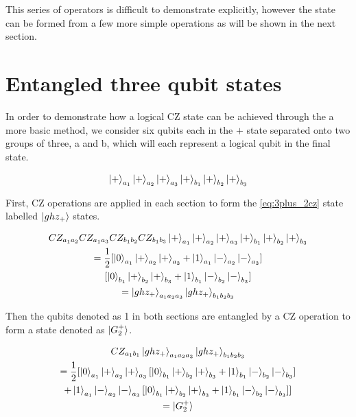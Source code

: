 This series of operators is difficult to demonstrate explicitly, however the state can be formed from a few more simple operations as will be shown in the next section.


\section{Entangled three qubit states}
\label{sec:entag_3_qb}

In order to demonstrate how a logical CZ state can be achieved through the a more basic method, we consider six qubits each in the $+$ state separated onto two groups of three, a and b, which will each represent a logical qubit in the final state.

\begin{equation*}
\ket{+}_{a_{1}} \ket{+}_{a_{2}} \ket{+}_{a_{3}} \ket{+}_{b_{1}} \ket{+}_{b_{2}} \ket{+}_{b_{3}}
\end{equation*}

First, CZ operations are applied in each section to form the \eqref{eq:3plus_2cz} state labelled $\ket{ghz_{+}}$ states.

\begin{multline}
CZ_{a_{1}a_{2}} CZ_{a_{1}a_{3}} CZ_{b_{1}b_{2}} CZ_{b_{1}b_{3}} \ket{+}_{a_{1}} \ket{+}_{a_{2}} \ket{+}_{a_{3}} \ket{+}_{b_{1}} \ket{+}_{b_{2}} \ket{+}_{b_{3}} \\
= \frac{1}{2} [\ket{0}_{a_{1}} \ket{+}_{a_{2}} \ket{+}_{a_{3}} + \ket{1}_{a_{1}} \ket{-}_{a_{2}} \ket{-}_{a_{3}}] \\
[\ket{0}_{b_{1}} \ket{+}_{b_{2}} \ket{+}_{b_{3}} + \ket{1}_{b_{1}} \ket{-}_{b_{2}} \ket{-}_{b_{3}}] \\
= \ket{ghz_{+}}_{a_{1}a_{2}a_{3}} \ket{ghz_{+}}_{b_{1}b_{2}b_{3}} \\
\end{multline}

Then the qubits denoted as 1 in both sections are entangled by a CZ operation to form a state denoted as $\ket{G^{+}_{2}}$.

\begin{multline}
\label{eq:cz_bridge}
CZ_{a_{1}b_{1}} \ket{ghz_{+}}_{a_{1}a_{2}a_{3}} \ket{ghz_{+}}_{b_{1}b_{2}b_{3}} \\
= \frac{1}{2} [\ket{0}_{a_{1}} \ket{+}_{a_{2}} \ket{+}_{a_{3}} [\ket{0}_{b_{1}} \ket{+}_{b_{2}} \ket{+}_{b_{3}} + \ket{1}_{b_{1}} \ket{-}_{b_{2}} \ket{-}_{b_{3}}] \\
 + \ket{1}_{a_{1}} \ket{-}_{a_{2}} \ket{-}_{a_{3}}[\ket{0}_{b_{1}} \ket{+}_{b_{2}} \ket{+}_{b_{3}} + \ket{1}_{b_{1}} \ket{-}_{b_{2}} \ket{-}_{b_{3}}]]  \\
 = \ket{G^{+}_{2}} \\
\end{multline}

